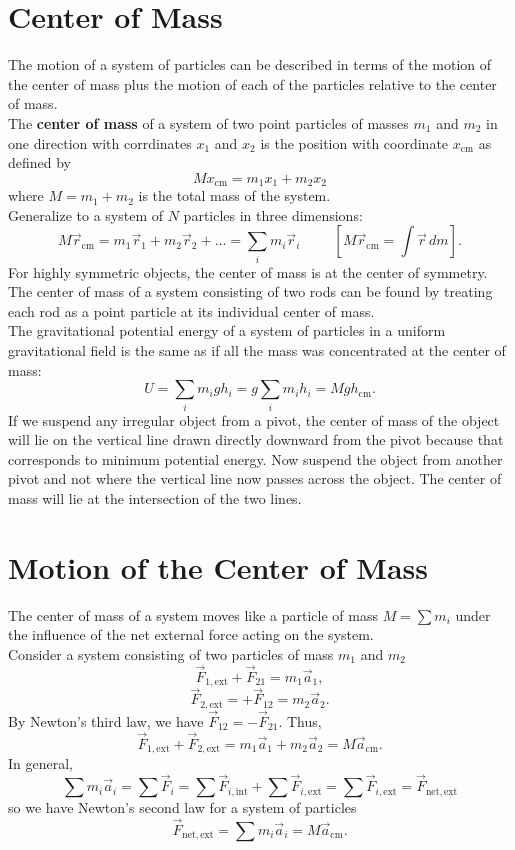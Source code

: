 \documentclass[11pt,letter]{report}
\begin{document}
\section{Center of Mass}
The motion of a system of particles can be described in terms of the motion of the center of mass plus the motion of each of the particles relative to the center of mass.
\\The \textbf{center of mass} of a system of two point particles of masses $m_1$ and $m_2$ in one direction with corrdinates $x_1$ and $x_2$ is the position with coordinate $x_\mathrm{cm}$ as defined by $$M x_\mathrm{cm} = m_1 x_1 + m_2 x_2$$ where $M = m_1 + m_2$ is the total mass of the system.
\\Generalize to a system of $N$ particles in three dimensions: $$M \vec{r}_\mathrm{cm} = m_1 \vec{r}_1 + m_2 \vec{r}_2 + \dots = \sum_i m_i \vec{r}_i \hspace{1cm} \left[M \vec{r}_\mathrm{cm} = \int{\vec{r}\,dm}\right].$$
For highly symmetric objects, the center of mass is at the center of symmetry. The center of mass of a system consisting of two rods can be found by treating each rod as a point particle at its individual center of mass.
\\The gravitational potential energy of a system of particles in a uniform gravitational field is the same as if all the mass was concentrated at the center of mass: $$U = \sum_i m_i gh_i = g \sum_i m_i h_i = Mgh_\mathrm{cm}.$$
If we suspend any irregular object from a pivot, the center of mass of the object will lie on the vertical line drawn directly downward from the pivot because that corresponds to minimum potential energy. Now suspend the object from another pivot and not where the vertical line now passes across the object. The center of mass will lie at the intersection of the two lines.

\section{Motion of the Center of Mass}
The center of mass of a system moves like a particle of mass $M = \sum{m_i}$ under the influence of the net external force acting on the system.
\\Consider a system consisting of two particles of mass $m_1$ and $m_2$ $$\vec{F}_{1\mathrm{, ext}} + \vec{F}_{21} = m_1 \vec{a}_1,$$ $$\vec{F}_{2\mathrm{, ext}} = +\vec{F}_{12} = m_2 \vec{a}_2.$$
By Newton's third law, we have $\vec{F}_{12} = -\vec{F}_{21}$. Thus, $$\vec{F}_{1\mathrm{, ext}} + \vec{F}_{2\mathrm{, ext}} = m_1 \vec{a}_1 +m_2 \vec{a}_2 = M \vec{a}_\mathrm{cm}.$$
In general, $$\sum m_i \vec{a}_i = \sum \vec{F}_i = \sum \vec{F}_{i\mathrm{, int}} + \sum \vec{F}_{i\mathrm{, ext}} = \sum \vec{F}_{i\mathrm{, ext}} = \vec{F}_\mathrm{net, ext}$$ so we have Newton's second law for a system of particles $$\vec{F}_\mathrm{net, ext} = \sum m_i \vec{a}_i = M \vec{a}_\mathrm{cm}.$$
\end{document}
